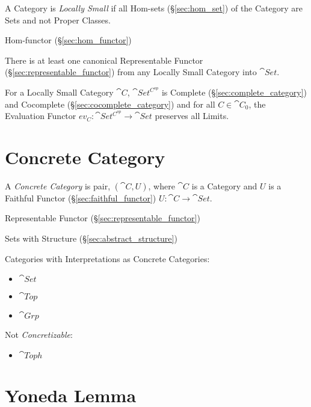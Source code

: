 A Category is \emph{Locally Small} if all Hom-sets
(\S\ref{sec:hom_set}) of the Category are Sets and not Proper Classes.

Hom-functor (\S\ref{sec:hom_functor})

There is at least one canonical Representable Functor
(\S\ref{sec:representable_functor}) from any Locally Small Category
into $\cat{Set}$.

For a Locally Small Category $\cat{C}$, $\cat{Set^{C^{op}}}$ is
Complete (\S\ref{sec:complete_category}) and Cocomplete
(\S\ref{sec:cocomplete_category}) and for all $C \in \cat{C}_0$,
the Evaluation Functor $ev_C : \cat{Set^{C^{op}}} \rightarrow
\cat{Set}$ preserves all Limits. \cite{awodey06}



\section{Concrete Category}\label{sec:concrete_category}

A \emph{Concrete Category} is pair, $(\cat{C},U)$, where $\cat{C}$ is
a Category and $U$ is a Faithful Functor
(\S\ref{sec:faithful_functor}) $U : \cat{C} \rightarrow \cat{Set}$.

Representable Functor (\S\ref{sec:representable_functor})

Sets with Structure (\S\ref{sec:abstract_structure})

Categories with Interpretations as Concrete Categories:
\begin{itemize}
  \item $\cat{Set}$
  \item $\cat{Top}$
  \item $\cat{Grp}$
\end{itemize}

Not \emph{Concretizable}:
\begin{itemize}
  \item $\cat{Toph}$
\end{itemize}



\section{Yoneda Lemma}\label{sec:yoneda_lemma}

